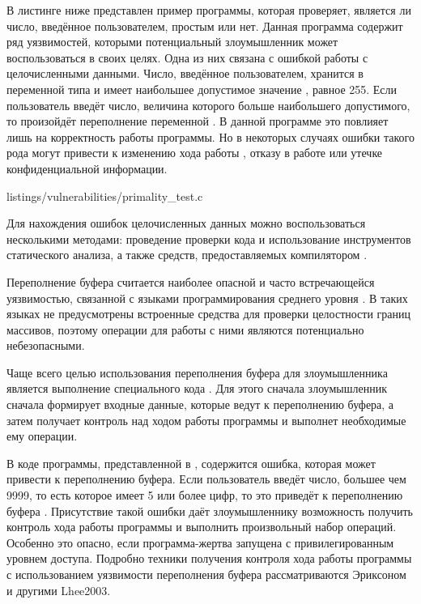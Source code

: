 %
В листинге ниже представлен пример программы, которая проверяет, является ли число, введённое пользователем, простым или нет. 
%
Данная программа содержит ряд уязвимостей, которыми потенциальный злоумышленник может воспользоваться в своих целях. 
%
Одна из них связана с ошибкой работы с целочисленными данными.
%
Число, введённое пользователем, хранится в переменной  типа  и имеет наибольшее допустимое значение , равное 255.
%
Если пользователь введёт число, величина которого больше наибольшего допустимого, то произойдёт переполнение переменной . 
%
В данной программе это повлияет лишь на корректность работы программы. 
%
Но в некоторых случаях ошибки такого рода могут привести к изменению хода работы , отказу в работе или утечке конфиденциальной информации.

	{listings/vulnerabilities/primality_test.c}

%
Для нахождения ошибок целочисленных данных можно воспользоваться несколькими методами: проведение проверки кода и использование инструментов статического анализа, а также средств, предоставляемых компилятором  .



%
Переполнение буфера считается наиболее опасной и часто встречающейся уязвимостью, связанной с языками программирования среднего уровня . 
%
В таких языках не предусмотрены встроенные средства для проверки целостности границ массивов, поэтому операции для работы с ними являются потенциально небезопасными. 

%
Чаще всего целью использования переполнения буфера для злоумышленника является выполнение специального кода . 
%
Для этого сначала злоумышленник сначала формирует входные данные, которые ведут к переполнению буфера, а затем получает контроль над ходом работы программы и выполнет необходимые ему операции. 

%
В коде программы, представленной в  , содержится ошибка, которая может привести к переполнению буфера.
%
Если пользователь введёт число, большее чем 9999, то есть которое имеет 5 или более цифр, то это приведёт к переполнению буфера .
%
Присутствие такой ошибки даёт злоумышленнику возможность получить контроль хода работы программы и выполнить произвольный набор операций.
%
Особенно это опасно, если программа-жертва запущена с привилегированным уровнем доступа.
%
Подробно техники получения контроля хода работы программы с использованием уязвимости переполнения буфера рассматриваются Эриксоном и другими  {Lhee2003}.

